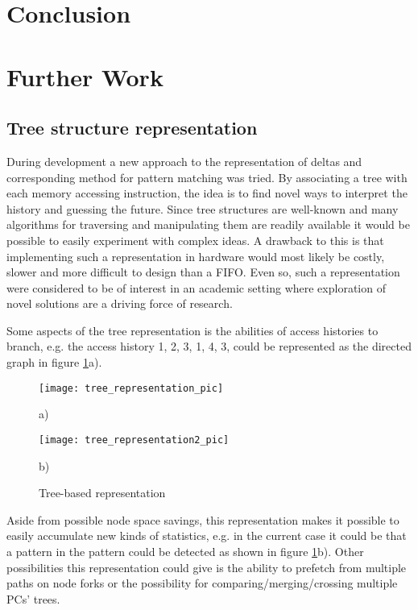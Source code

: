 \documentclass[12pt,journal,compsoc]{IEEEtran}
\begin{document}
\section{Conclusion}

\section{Further Work}

\subsection{Tree structure representation}
During development a new approach to the representation of deltas
and corresponding method for pattern matching was tried. By associating
a tree with each memory accessing instruction, the idea is to find novel ways
to interpret the history and guessing the future. Since tree structures
are well-known and many algorithms for traversing and manipulating them
are readily available it would be possible to easily experiment
with complex ideas. A drawback to this is that implementing such a
representation in hardware would most likely be costly, slower
and more difficult to design than a FIFO. Even so, such a
representation were considered to be of interest in an academic
setting where exploration of novel solutions are a driving force of
research.

Some aspects of the tree representation is the abilities of access histories
to branch, e.g. the access history 1, 2, 3, 1, 4, 3, could be represented
as the directed graph in figure \ref{fig:DG}a).

\begin{figure}
\begin{center}
\texttt{[image: tree\_representation\_pic]}

a)
\end{center}
\begin{center}
\texttt{[image: tree\_representation2\_pic]}

b)
\end{center}
\caption{\label{fig:DG} Tree-based representation}
\end{figure}

Aside from possible node space savings, this representation makes it
possible to easily accumulate new kinds of statistics, e.g. in the
current case it could be that a pattern in the pattern could be
detected as shown in figure \ref{fig:DG}b). Other possibilities this
representation could give is the ability to prefetch from multiple
paths on node forks or the possibility for comparing/merging/crossing
multiple PCs' trees.
\end{document}
